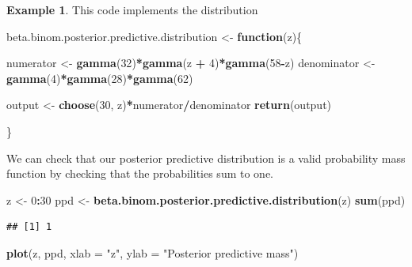 \documentclass[
]{book}
\newenvironment{Shaded}{\begin{snugshade}}{\end{snugshade}}
\newcommand{\AttributeTok}[1]{\textcolor[rgb]{0.13,0.29,0.53}{#1}}
\newcommand{\ControlFlowTok}[1]{\textcolor[rgb]{0.13,0.29,0.53}{\textbf{#1}}}
\newcommand{\DecValTok}[1]{\textcolor[rgb]{0.00,0.00,0.81}{#1}}
\newcommand{\FunctionTok}[1]{\textcolor[rgb]{0.13,0.29,0.53}{\textbf{#1}}}
\newcommand{\NormalTok}[1]{#1}
\newcommand{\OtherTok}[1]{\textcolor[rgb]{0.56,0.35,0.01}{#1}}
\newcommand{\SpecialCharTok}[1]{\textcolor[rgb]{0.81,0.36,0.00}{\textbf{#1}}}
\newcommand{\StringTok}[1]{\textcolor[rgb]{0.31,0.60,0.02}{#1}}
\theoremstyle{definition}
\theoremstyle{definition}
\newtheorem{example}{Example}[chapter]
\theoremstyle{definition}
\theoremstyle{definition}
\theoremstyle{remark}
\begin{document}
\begin{example}
This code implements the distribution

\begin{Shaded}
\begin{Highlighting}[]
\NormalTok{beta.binom.posterior.predictive.distribution }\OtherTok{\textless{}{-}} \ControlFlowTok{function}\NormalTok{(z)\{}
  
  
\NormalTok{  numerator }\OtherTok{\textless{}{-}} \FunctionTok{gamma}\NormalTok{(}\DecValTok{32}\NormalTok{)}\SpecialCharTok{*}\FunctionTok{gamma}\NormalTok{(z }\SpecialCharTok{+} \DecValTok{4}\NormalTok{)}\SpecialCharTok{*}\FunctionTok{gamma}\NormalTok{(}\DecValTok{58}\SpecialCharTok{{-}}\NormalTok{z)}
\NormalTok{  denominator }\OtherTok{\textless{}{-}} \FunctionTok{gamma}\NormalTok{(}\DecValTok{4}\NormalTok{)}\SpecialCharTok{*}\FunctionTok{gamma}\NormalTok{(}\DecValTok{28}\NormalTok{)}\SpecialCharTok{*}\FunctionTok{gamma}\NormalTok{(}\DecValTok{62}\NormalTok{)}
  
\NormalTok{  output }\OtherTok{\textless{}{-}} \FunctionTok{choose}\NormalTok{(}\DecValTok{30}\NormalTok{, z)}\SpecialCharTok{*}\NormalTok{numerator}\SpecialCharTok{/}\NormalTok{denominator}
  \FunctionTok{return}\NormalTok{(output)}
  
\NormalTok{\}}
\end{Highlighting}
\end{Shaded}

We can check that our posterior predictive distribution is a valid probability mass function by checking that the probabilities sum to one.

\begin{Shaded}
\begin{Highlighting}[]
\NormalTok{z }\OtherTok{\textless{}{-}} \DecValTok{0}\SpecialCharTok{:}\DecValTok{30}
\NormalTok{ppd }\OtherTok{\textless{}{-}} \FunctionTok{beta.binom.posterior.predictive.distribution}\NormalTok{(z)}
\FunctionTok{sum}\NormalTok{(ppd)}
\end{Highlighting}
\end{Shaded}

\begin{verbatim}
## [1] 1
\end{verbatim}

\begin{Shaded}
\begin{Highlighting}[]
\FunctionTok{plot}\NormalTok{(z, ppd, }\AttributeTok{xlab =} \StringTok{"z"}\NormalTok{, }\AttributeTok{ylab =} \StringTok{"Posterior predictive mass"}\NormalTok{)}
\end{Highlighting}
\end{Shaded}


\end{example}
\end{document}
